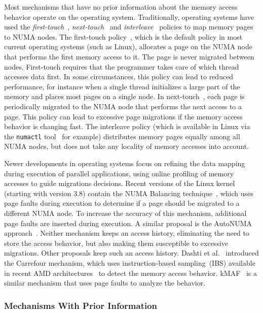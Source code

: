Most mechanisms that have no prior information about the memory access behavior operate on the operating system.
Traditionally, operating systems have used the \emph{first-touch}~\cite{Marchetti1995}, \emph{next-touch}~\cite{Lof2005} and \emph{interleave}~\cite{Kleen2004} policies to map memory pages to NUMA nodes.
The first-touch policy~\cite{Marchetti1995}, which is the default policy in most current operating systems (such as Linux), allocates a page on the NUMA node that performs the first memory access to it.
The page is never migrated between nodes.
First-touch requires that the programmer takes care of which thread accesses data first.
In some circumstances, this policy can lead to reduced performance, for
instance when a single thread initializes a large part of the memory and places most pages on a single node.
In next-touch~\cite{Lof2005}, each page is periodically migrated to the NUMA node that performs the next access to a page.
This policy can lead to excessive page migrations if the memory access behavior is changing fast.
The interleave policy (which is available in Linux via the \texttt{numactl} tool~\cite{Kleen2004} for example) distributes memory pages equally among all NUMA nodes, but does not take any locality of memory accesses into account.

Newer developments in operating systems focus on refining the data mapping during execution of parallel applications, using online profiling of memory accesses to guide migrations decisions.
Recent versions of the Linux kernel (starting with version 3.8) contain the NUMA Balancing technique~\cite{Corbet}, which uses page faults during execution to determine if a page should be migrated to a different NUMA node. To increase the accuracy of this mechanism, additional page faults are inserted during execution.
A similar proposal is the AutoNUMA approach~\cite{Corbet2012}.
Neither mechanism keeps an access history, eliminating the need to store the access behavior, but also making them susceptible to excessive migrations.
Other proposals keep such an access history.
Dashti et al.~\cite{Dashti2013} introduced the Carrefour mechanism, which uses instruction-based sampling~(IBS) available in recent AMD architectures~\cite{AMD2012} to detect the memory access behavior.
kMAF~\cite{Diener2014} is a similar mechanism that uses page faults to analyze the behavior.


\subsubsection{Mechanisms With Prior Information}


